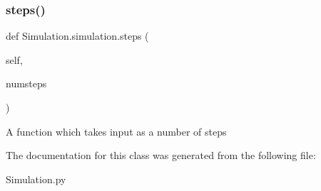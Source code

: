 \subsubsection{\texorpdfstring{steps()}{steps()}}
{\footnotesize\ttfamily def Simulation.\+simulation.\+steps (\begin{DoxyParamCaption}\item[{}]{self,  }\item[{}]{numsteps }\end{DoxyParamCaption})}

\begin{DoxyVerb}A function which takes input as a number of steps
\end{DoxyVerb}
 

The documentation for this class was generated from the following file\+:\begin{DoxyCompactItemize}
\item 
Simulation.\+py\end{DoxyCompactItemize}

